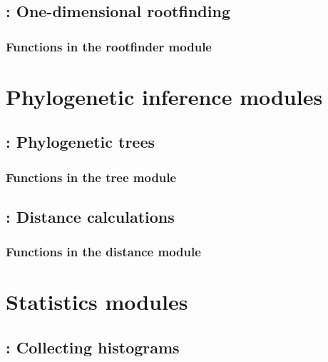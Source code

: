\documentclass[10pt]{book}
\begin{document}
\newpage
\section{: One-dimensional rootfinding}

\subsection{Functions in the rootfinder module}


\chapter{Phylogenetic inference modules}

\newpage
\section{: Phylogenetic trees}

\subsection{Functions in the tree module}


\newpage
\section{: Distance calculations}

\subsection{Functions in the distance module}







\newpage
\chapter{Statistics modules}


\newpage
\section{: Collecting histograms}

\end{document}
